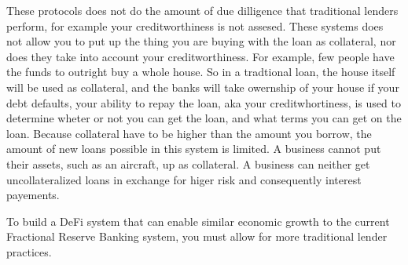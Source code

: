 These protocols does not do the amount of due dilligence that traditional lenders perform, for example your creditworthiness is not assesed. These systems does not allow you to put up the thing you are buying with the loan as collateral, nor does they take into account your creditworthiness. For example, few people have the funds to outright buy a whole house. So in a tradtional loan, the house itself will be used as collateral, and the banks will take owernship of your house if your debt defaults, your ability to repay the loan, aka your creditwhortiness, is used to determine wheter or not you can get the loan, and what terms you can get on the loan. Because collateral have to be higher than the amount you borrow, the amount of new loans possible in this system is limited. A business cannot put their assets, such as an aircraft, up as collateral. A business can neither get uncollateralized loans in exchange for higer risk and consequently interest payements. 

To build a DeFi system that can enable similar economic growth to the current Fractional Reserve Banking system, you must allow for more traditional lender practices.